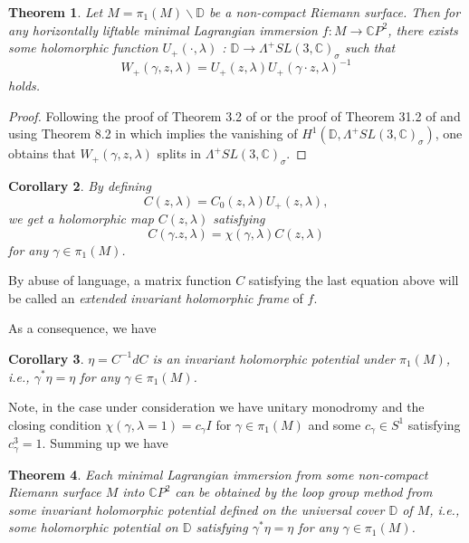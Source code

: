 \documentclass[a4paper,11pt]{amsart}
\newtheorem{theorem}{Theorem}[section]
\newtheorem{corollary}[theorem]{Corollary}
\theoremstyle{definition}
\numberwithin{equation}{section}
\newcommand{\C}{\mathbb{C}}
\begin{document}
\begin{theorem} 
Let $M= \pi_1(M) \backslash \mathbb{D}$  be a non-compact Riemann surface. Then for any horizontally liftable minimal Lagrangian immersion $f: M\rightarrow \mathbb{C}P^2$, 
there exists some holomorphic function $U_+(\cdot, \lambda)$
: $\mathbb{D}\rightarrow \Lambda^{+} SL(3,\mathbb{C})_{\sigma}$ such that
\begin{equation}\label{eq:W+spliting}
 W_+(\gamma, z, \lambda)=U_+(z,\lambda) U_+(\gamma\cdot z, \lambda)^{-1}
\end{equation} 
holds.
\end{theorem}


\begin{proof}
Following the proof of Theorem 3.2 of \cite{DH03} or the proof of Theorem 31.2 of \cite{Forster} and using Theorem 8.2 in \cite{Bungart} which implies the vanishing of $H^1(\mathbb{D}, \Lambda^+SL(3,\mathbb{C})_{\sigma})$, one obtains that $W_+(\gamma,z,\lambda)$ splits in $\Lambda^+ SL(3,\mathbb{C})_{\sigma}$.
\end{proof}


\begin{corollary}
 By defining 
\begin{equation}
C(z,\lambda)= C_0(z,\lambda) U_+(z,\lambda),
\end{equation}
we get a holomorphic map $C(z,\lambda)$ satisfying
\begin{equation}
C(\gamma . z, \lambda)=\chi(\gamma, \lambda) C(z,\lambda)
\end{equation}
for any $\gamma\in \pi_1(M)$.
\end{corollary}


By abuse of language, a matrix function $C$ satisfying the last equation above will be  called an \emph{extended invariant holomorphic frame} of $f$.

As a consequence, we have 

\begin{corollary}
 $\eta=C^{-1} dC$ is an invariant holomorphic potential under $\pi_1(M)$, i.e.,
 $\gamma^*\eta=\eta$
 for any $\gamma\in \pi_1(M)$.
 \end{corollary}

Note, in the case under consideration we have  unitary monodromy and the closing condition 
$\chi(\gamma, \lambda=1)= c_\gamma I$ for $\gamma\in \pi_1(M)$ and some $c_\gamma  \in S^1$ satisfying $c_\gamma^3 =1$.
Summing up we have

\begin{theorem}\label{Thm 5.10}
Each minimal Lagrangian
immersion  from some non-compact Riemann surface $M$ into $\C P^2$
can be obtained by the loop group method from some 
invariant holomorphic potential defined on the universal cover $\mathbb{D}$ of $M$, i.e., some holomorphic potential on $\mathbb{D}$ satisfying $\gamma^*\eta=\eta$
 for any $\gamma\in \pi_1(M)$.
\end{theorem}
\end{document}
